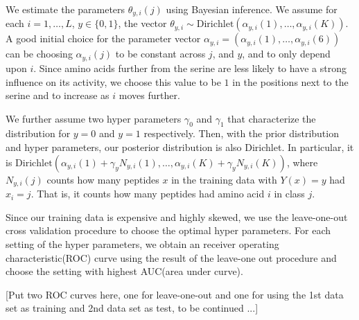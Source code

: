 \documentclass[12pt]{article}
\newcommand{\Dir}{\mathrm{Dirichlet}}
\begin{document}
We estimate the parameters $\theta_{y,i}(j)$ using Bayesian inference. We assume for each $i=1,\ldots,L$, $y\in\{0,1\}$, the vector $\theta_{y,i}\sim\Dir(\alpha_{y,i}(1),\ldots,\alpha_{y,i}(K))$. A good initial choice for the parameter vector $\alpha_{y,i} = (\alpha_{y,i}(1),\ldots,\alpha_{y,i}(6))$ can be choosing $\alpha_{y,i}(j)$ to be constant across $j$, and $y$, and to only depend upon $i$. Since amino acids further from the serine are less likely to have a strong influence on its activity, we choose this value to be $1$ in the positions next to the serine and to increase as $i$ moves further.

We further assume two hyper parameters $\gamma_0$ and $\gamma_1$ that characterize the distribution for $y=0$ and $y=1$ respectively. Then, with the prior distribution and hyper parameters, our posterior distribution is also Dirichlet. In particular, it is 
$\Dir( \alpha_{y,i}(1) + \gamma_yN_{y,i}(1), \ldots, \alpha_{y,i}(K) + \gamma_yN_{y,i}(K))$,
where $N_{y,i}(j)$ counts how many peptides $x$ in the training data with $Y(x)=y$ had $x_i=j$.  That is, it counts how many peptides had amino acid $i$ in class $j$.

Since our training data is expensive and highly skewed, we use the leave-one-out cross validation procedure to choose the optimal hyper parameters. For each setting of the hyper parameters, we obtain an receiver operating characteristic(ROC) curve using the result of the leave-one out procedure and choose the setting with highest AUC(area under curve).

[Put two ROC curves here, one for leave-one-out and one for using the 1st data set as training and 2nd data set as test, to be continued ...]
\end{document}
